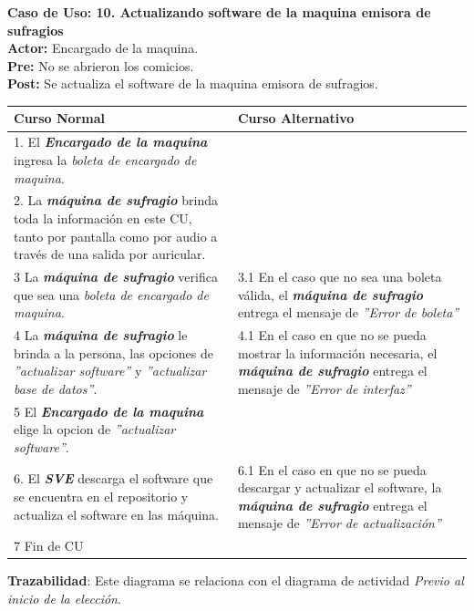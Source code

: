 \documentclass[spanish, 10pt,a4paper]{article}
\numberwithin{equation}{section} %
\begin{document}
\noindent\textbf{Caso de Uso: 10. Actualizando software de la maquina emisora de sufragios}\\
\textbf{Actor: } Encargado de la maquina.\\
\textbf{Pre: } No se abrieron los comicios.\\
\textbf{Post: } Se actualiza el software de la maquina emisora de sufragios.\\
\begin{table}[H]
  \centering
\bgroup
\def\arraystretch{1.3}
  \begin{tabular}{p{9cm} | p{7cm}}
    \hline
    Curso Normal & Curso Alternativo \\
    \hline
    \hline    
    1. El \textbf{\textit{Encargado de la maquina}} ingresa la \textit{boleta de encargado de maquina}. 
    & \\
    
    \hline
    2. La \textbf{\textit{máquina de sufragio}} brinda toda la información en este CU, tanto por pantalla como por audio a través de una salida por auricular.
    &
    \\
    
    \hline
    3 La \textbf{\textit{máquina de sufragio}} verifica que sea una \textit{boleta de encargado de maquina}.
    & 
    3.1 En el caso que no sea una boleta válida, el \textbf{\textit{máquina de sufragio}} entrega el mensaje de \textit{''Error de boleta''}
    \\
    
    \hline
    4 La \textbf{\textit{máquina de sufragio}} le brinda a la persona, las opciones de \textit{''actualizar software''} y \textit{''actualizar base de datos''}.
    & 
    4.1 En el caso en que no se pueda mostrar la información necesaria, el \textbf{\textit{máquina de sufragio}} entrega el mensaje de \textit{''Error de interfaz''}
    \\
    
    \hline
    5 El \textbf{\textit{Encargado de la maquina}} elige la opcion de \textit{''actualizar software''}.
    & \\
    
    \hline
    6. El \textbf{\textit{SVE}} descarga el software que se encuentra en el repositorio y actualiza el software en las máquina.
    &
    6.1 En el caso en que no se pueda descargar y actualizar el software, la \textbf{\textit{máquina de sufragio}} entrega el mensaje de \textit{''Error de actualización''}
    \\
    
    \hline
    7 Fin de CU
    & \\
    \hline
  \end{tabular}
\egroup
\end{table}
\vspace{-10px}
\noindent\textbf{Trazabilidad}: Este diagrama se relaciona con el diagrama de actividad \textit{Previo al inicio de la elección}.\\
\end{document}
